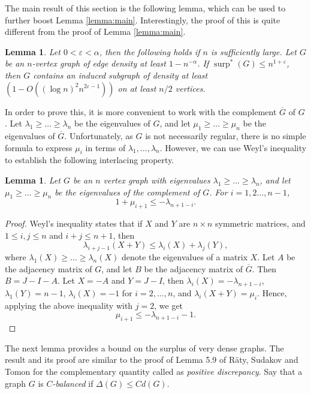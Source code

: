 \documentclass[11pt]{article}
\theoremstyle{plain}
\newtheorem{lemma}[theorem]{Lemma}
\theoremstyle{definition}
\DeclareMathOperator{\surp}{surp}
\newcommand{\eps}{\varepsilon}
\begin{document}
The main result of this section is the following lemma, which can be used to further boost Lemma \ref{lemma:main}. Interestingly, the proof of this is quite different from the proof of Lemma \ref{lemma:main}.

\begin{lemma}\label{lemma:very_dense}
Let $0<\eps<\alpha$, then the following holds if $n$ is sufficiently large. Let $G$ be an $n$-vertex graph of edge density at least $1-n^{-\alpha}$. If $\surp^*(G)\leq n^{1+\eps}$, then $G$ contains an induced subgraph of density at least $(1-O((\log n)^2n^{2\eps-1}))$ on at least $n/2$ vertices.
\end{lemma}

In order to prove this, it is more convenient to work with the complement $\overline{G}$ of $G$. Let $\lambda_1\geq \dots\geq \lambda_n$ be the eigenvalues of $G$, and let $\mu_1\geq \dots\geq \mu_n$ be the eigenvalues of $\overline{G}$. Unfortunately, as $G$ is not necessarily regular, there is no simple formula to express $\mu_i$ in terms of $\lambda_1,\dots,\lambda_n$. However, we can use Weyl's inequality to establish the following interlacing property.

\begin{lemma}\label{lemma:weyl}
Let $G$ be an $n$ vertex graph with eigenvalues $\lambda_1\geq \dots\geq \lambda_n$, and let $\mu_1\geq \dots\geq \mu_n$ be the eigenvalues of the complement of $G$. For $i=1,2\dots,n-1$, $$1+\mu_{i+1}\leq -\lambda_{n+1-i}.$$
\end{lemma}

\begin{proof}
Weyl's inequality states that if $X$ and $Y$ are $n\times n$ symmetric matrices, and $1\leq i,j\leq n$ and $i+j\leq n+1$, then $$\lambda_{i+j-1}(X+Y)\leq \lambda_i(X)+\lambda_j(Y),$$
where $\lambda_1(X)\geq \dots\geq \lambda_n(X)$ denote the eigenvalues of a matrix $X$. Let $A$ be the adjacency matrix of $G$, and let $B$ be the adjacency matrix of $\overline{G}$. Then $B=J-I-A$. Let $X=-A$ and $Y=J-I$, then $\lambda_i(X)=-\lambda_{n+1-i}$, $\lambda_1(Y)=n-1$, $\lambda_i(X)=-1$ for $i=2,\dots,n$, and $\lambda_i(X+Y)=\mu_i$. Hence, applying the above inequality with $j=2$, we get
$$\mu_{i+1}\leq -\lambda_{n+1-i}-1.$$
\end{proof}

The next lemma provides a bound on the surplus of very dense graphs. The result and its proof are similar to the proof of Lemma 5.9 of R\"aty, Sudakov and Tomon \cite{RST} for the complementary quantity called as \emph{positive discrepancy}. Say that a graph $G$ is \emph{$C$-balanced} if $\Delta(G)\leq Cd(G)$. 
\end{document}
